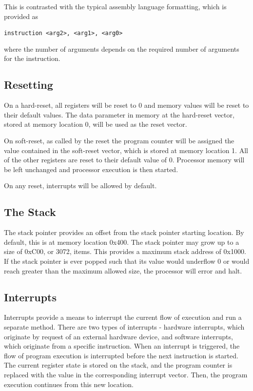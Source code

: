 \documentclass{article}
\begin{document}
This is contrasted with the typical assembly language formatting, which is provided as

\begin{center}
	\texttt{instruction <arg2>, <arg1>, <arg0>}
\end{center}

where the number of arguments depends on the required number of arguments for the instruction.

\subsection{Resetting}

On a hard-reset, all registers will be reset to 0 and memory values will be reset to their default values. The data parameter in memory at the hard-reset vector, stored at memory location 0, will be used as the reset vector.

On soft-reset, as called by the reset the program counter will be assigned the value contained in the soft-reset vector, which is stored at memory location 1. All of the other registers are reset to their default value of 0. Processor memory will be left unchanged and processor execution is then started.

On any reset, interrupts will be allowed by default.

\subsection{The Stack}

The stack pointer provides an offset from the stack pointer starting location. By default, this is at memory location 0x400. The stack pointer may grow up to a size of 0xC00, or 3072, items. This provides a maximum stack address of 0x1000. If the stack pointer is ever popped such that its value would underflow 0 or would reach greater than the maximum allowed size, the processor will error and halt.

\subsection{Interrupts}

Interrupts provide a means to interrupt the current flow of execution and run a separate method. There are two types of interrupts - hardware interrupts, which originate by request of an external hardware device, and software interrupts, which originate from a specific instruction. When an interrupt is triggered, the flow of program execution is interrupted before the next instruction is started. The current register state is stored on the stack, and the program counter is replaced with the value in the corresponding interrupt vector. Then, the program execution continues from this new location.
\end{document}
